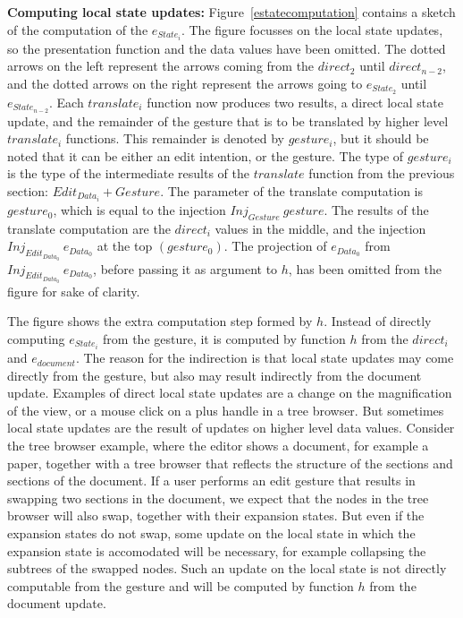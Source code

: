 \documentclass[twoside,epsf]{report}
\begin{document}
{\bf  Computing local state updates: }Figure~\ref{estatecomputation} contains a sketch of the computation of the $e_{State_i}$. The figure focusses on the local state updates, so the presentation function and the data values have been omitted. The dotted arrows on the left represent the arrows coming from the $direct_2$ until $direct_{n-2}$, and the dotted arrows on the right represent the arrows going to $e_{State_2}$ until $e_{State_{n-2}}$. Each $translate_i$ function now produces two results, a direct local state update, and the remainder of the gesture that is to be translated by higher level $translate_i$ functions. This remainder is denoted by $gesture_i$, but it should be noted that it can be either an edit intention, or the gesture. The type of $gesture_i$ is the type of the intermediate results of the $translate$ function from the previous section: $Edit_{Data_i}+Gesture$. The parameter of the translate computation is $gesture_0$, which is equal to the injection $Inj_{Gesture}~gesture$. The results of the translate computation are the $direct_i$ values in the middle, and the injection $Inj_{Edit_{Data_0}}~e_{Data_0}$ at the top $(gesture_0)$. The projection of $e_{Data_0}$ from $Inj_{Edit_{Data_0}}~e_{Data_0}$, before passing it as argument to $h$, has been omitted from the figure for sake of clarity.

The figure shows the extra computation step formed by $h$. Instead of directly computing $e_{State_i}$ from the gesture, it is computed by function $h$ from the $direct_i$ and $e_{document}$. The reason for the indirection is that local state updates may come directly from the gesture, but also may result indirectly from the document update. Examples of direct local state updates are a change on the magnification of the view, or a mouse click on a plus handle in a tree browser. But sometimes local state updates are the result of updates on higher level data values. Consider the tree browser example, where the editor shows a document, for example a paper, together with a tree browser that reflects the structure of the sections and sections of the document. If a user performs an edit gesture that results in swapping two sections in the document, we expect that the nodes in the tree browser will also swap, together with their expansion states. But even if the expansion states do not swap, some update on the local state in which the expansion state is accomodated will be necessary, for example collapsing the subtrees of the swapped nodes. Such an update on the local state is not directly computable from the gesture and will be computed by function $h$ from the document update.
\end{document}
